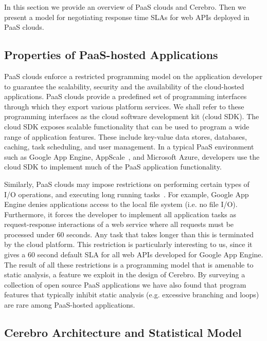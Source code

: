 In this section we provide an overview of PaaS clouds and Cerebro. Then we present a model for 
negotiating response time SLAs for web APIs deployed in PaaS clouds.

\vspace{-0.1in}
\subsection{ Properties of PaaS-hosted Applications}
\vspace{-0.1in}
PaaS clouds enforce a restricted programming model on the application developer to guarantee
the scalability, security and the availability of the cloud-hosted applications. 
PaaS clouds provide a predefined set of programming interfaces through which they export 
various platform services. We shall refer to these programming interfaces as the cloud software
development kit (cloud SDK). The cloud SDK exposes scalable functionality that can be used to 
program a wide range of application features. These include key-value data stores, databases, 
caching, task scheduling, and user management. In a typical PaaS environment
such as Google App Engine, AppScale~\cite{6488671}, and Microsoft Azure, 
developers use the cloud SDK to implement much of the PaaS application functionality.

Similarly, PaaS clouds may impose restrictions on performing
certain types of I/O operations, and executing long running tasks~\cite{gae-limits,azure-limits,gae-sandbox}. 
For example, Google App Engine
denies applications access to the local file system (i.e. no file I/O). Furthermore, it forces the
developer to implement all application tasks as request-response interactions of a web service
where all requests must be processed
under 60 seconds. Any task that takes longer than this is terminated by the cloud platform.
This restriction is particularly interesting to us, since it gives a 60 second default SLA
for all web APIs developed for Google App Engine.
The result of all these restrictions is a programming model that is
amenable to static analysis, a feature we exploit in the design of Cerebro. By surveying
a collection of open source PaaS applications we have also found that program features that typically
inhibit static analysis (e.g. excessive branching and loops) are rare among PaaS-hosted
applications.

\vspace{-0.1in}
\subsection{ Cerebro Architecture and Statistical Model}
\vspace{-0.1in}

